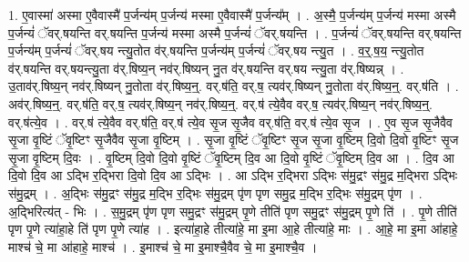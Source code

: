 \documentclass[17pt]{extarticle}
\begin{document}
1. ए॒वास्मा॑ अस्मा ए॒वैवास्मै॑ प॒र्जन्य॑म् प॒र्जन्य॑ मस्मा ए॒वैवास्मै॑ प॒र्जन्य᳚म् । . अ॒स्मै॒ प॒र्जन्य॑म् प॒र्जन्य॑ मस्मा अस्मै प॒र्जन्यं॑ ॅवर्.षयन्ति वर्.षयन्ति प॒र्जन्य॑ मस्मा अस्मै प॒र्जन्यं॑ ॅवर्.षयन्ति । . प॒र्जन्यं॑ ॅवर्.षयन्ति वर्.षयन्ति प॒र्जन्य॑म् प॒र्जन्यं॑ ॅवर्.षय न्त्यु॒तोत व॑र्.षयन्ति प॒र्जन्य॑म् प॒र्जन्यं॑ ॅवर्.षय न्त्यु॒त । . व॒र्॒.ष॒य॒ न्त्यु॒तोत व॑र्.षयन्ति वर्.षयन्त्यु॒ता व॑र्.षिष्य॒न् नव॑र्.षिष्यन् नु॒त व॑र्.षयन्ति वर्.षय न्त्यु॒ता व॑र्.षिष्यन्न् । . उ॒ताव॑र्.षिष्य॒न् नव॑र्.षिष्यन् नु॒तोता व॑र्.षिष्य॒न्॒. वर्.ष॑ति॒ वर्.ष॒ त्यव॑र्.षिष्यन् नु॒तोता व॑र्.षिष्य॒न्॒. वर्.ष॑ति । . अव॑र्.षिष्य॒न्॒. वर्.ष॑ति॒ वर्.ष॒ त्यव॑र्.षिष्य॒न् नव॑र्.षिष्य॒न्॒. वर्.ष॑ त्ये॒वैव वर्.ष॒ त्यव॑र्.षिष्य॒न् नव॑र्.षिष्य॒न्॒. वर्.ष॑त्ये॒व । . वर्.ष॑ त्ये॒वैव वर्.ष॑ति॒ वर्.ष॑ त्ये॒व सृ॒ज सृ॒जैव वर्.ष॑ति॒ वर्.ष॑ त्ये॒व सृ॒ज । . ए॒व सृ॒ज सृ॒जैवैव सृ॒जा वृ॒ष्टिं ॅवृ॒ष्टिꣳ सृ॒जैवैव सृ॒जा वृ॒ष्टिम् । . सृ॒जा वृ॒ष्टिं ॅवृ॒ष्टिꣳ सृ॒ज सृ॒जा वृ॒ष्टिम् दि॒वो दि॒वो वृ॒ष्टिꣳ सृ॒ज सृ॒जा वृ॒ष्टिम् दि॒वः । . वृ॒ष्टिम् दि॒वो दि॒वो वृ॒ष्टिं ॅवृ॒ष्टिम् दि॒व आ दि॒वो वृ॒ष्टिं ॅवृ॒ष्टिम् दि॒व आ । . दि॒व आ दि॒वो दि॒व आ ऽद्भि र॒द्भिरा दि॒वो दि॒व आ ऽद्भिः । . आ ऽद्भि र॒द्भिरा ऽद्भिः स॑मु॒द्रꣳ स॑मु॒द्र म॒द्भिरा ऽद्भिः स॑मु॒द्रम् । . अ॒द्भिः स॑मु॒द्रꣳ स॑मु॒द्र म॒द्भि र॒द्भिः स॑मु॒द्रम् पृ॑ण पृण समु॒द्र म॒द्भि र॒द्भिः स॑मु॒द्रम् पृ॑ण । . अ॒द्भिरित्य॑त् - भिः । . स॒मु॒द्रम् पृ॑ण पृण समु॒द्रꣳ स॑मु॒द्रम् पृ॒णे तीति॑ पृण समु॒द्रꣳ स॑मु॒द्रम् पृ॒णे ति॑ । . पृ॒णे तीति॑ पृण पृ॒णे त्या॑हा॒हे ति॑ पृण पृ॒णे त्या॑ह । . इत्या॑हा॒हे तीत्या॑हे॒ मा इ॒मा आ॒हे तीत्या॑हे॒ माः । . आ॒हे॒ मा इ॒मा आ॑हाहे॒ माश्च॑ चे॒ मा आ॑हाहे॒ माश्च॑ । . इ॒माश्च॑ चे॒ मा इ॒माश्चै॒वैव चे॒ मा इ॒माश्चै॒व । \newline
\end{document}
